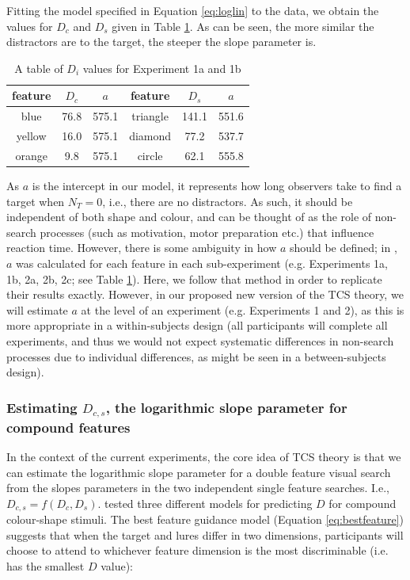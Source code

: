 \documentclass[preprint,12pt,authoryear]{elsarticle}
\begin{document}
Fitting the model specified in Equation \ref{eq:loglin} to the data, we obtain the values for $D_c$ and $D_s$ given in Table \ref{tab:reimp_Dc_Ds}. As can be seen, the more similar the distractors are to the target, the steeper the slope parameter is. 

\begin{table}[h]
\centering
\begin{tabular}{ ccc|ccc } 
feature & $D_c$ & $a$ & feature & $D_s$ & $a$\\
 \hline 
blue & 76.8 & 575.1 & triangle & 141.1 & 551.6\\
yellow & 16.0 & 575.1 & diamond & 77.2 & 537.7\\
orange & 9.8 & 575.1 & circle & 62.1& 555.8\\
\end{tabular}
\caption{A table of $D_i$ values for Experiment 1a and 1b}
\label{tab:reimp_Dc_Ds}
\end{table}

As $a$ is the intercept in our model, it represents how long observers take to find a target when $N_T = 0$, i.e., there are no distractors. As such, it should be independent of both shape and colour, and can be thought of as the role of non-search processes (such as motivation, motor preparation etc.) that influence reaction time. However, there is some ambiguity in how $a$ should be defined; in \cite{buetti2019predicting}, $a$ was calculated for each feature in each sub-experiment (e.g. Experiments 1a, 1b, 2a, 2b, 2c; see Table \ref{tab:reimp_Dc_Ds}). Here, we follow that method in order to replicate their results exactly. However, in our proposed new version of the TCS theory, we will estimate $a$ at the level of an experiment (e.g. Experiments 1 and 2), as this is more appropriate in a within-subjects design (all participants will complete all experiments, and thus we would not expect systematic differences in non-search processes due to individual differences, as might be seen in a between-subjects design).

\subsubsection{Estimating $D_{c,s}$, the logarithmic slope parameter for compound features}

In the context of the current experiments, the core idea of TCS theory is that we can estimate the logarithmic slope parameter for a double feature visual search from the slopes parameters in the two independent single feature searches. I.e., $D_{c,s} = f(D_c, D_s)$. \cite{buetti2019predicting} tested three different models for predicting $D$ for compound colour-shape stimuli. The best feature guidance model (Equation \ref{eq:bestfeature}) suggests that when the target and lures differ in two dimensions, participants will choose to attend to whichever feature dimension is the most discriminable (i.e. has the smallest $D$ value):
\end{document}
